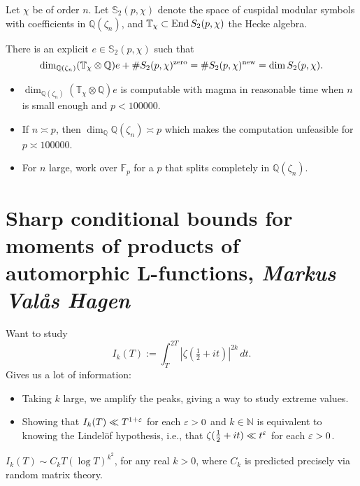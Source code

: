 \documentclass[reqno]{amsart} 
\begin{document}
Let $\chi$ be of order $n$.  Let $\mathbb{S}_2(p, \chi)$ denote the space of cuspidal modular symbols with coefficients in $\mathbb{Q}(\zeta_n)$, and $\mathbb{T}_\chi \subset \operatorname{End} S_2(p, \chi)$ the Hecke algebra.
\begin{lemma}
  There is an explicit $e \in \mathbb{S}_2(p, \chi)$ such that
  \begin{equation*}
    \dim_{\mathbb{Q}(\zeta_n)}(\mathbb{T}_\chi \otimes \mathbb{Q})e +
    \# S_2(p, \chi)^{\mathrm{zero}}
    = \# S_2(p, \chi)^{\operatorname{new}}
    = \dim S_2(p, \chi).
  \end{equation*}
\end{lemma}
\begin{itemize}
\item $\dim_{\mathbb{Q}(\zeta_n)}(\mathbb{T}_\chi \otimes \mathbb{Q}) e$ is computable with magma in reasonable time when $n$ is small enough and $p < 100000$.
\item If $n \asymp p$, then $\dim_{\mathbb{Q}} \mathbb{Q}(\zeta_n) \asymp p$ which makes the computation unfeasible for $p \asymp 100000$.
\item For $n$ large, work over $\mathbb{F}_p$ for a $p$ that splits completely in $\mathbb{Q}(\zeta_n)$.
\end{itemize}

\section{Sharp conditional bounds for moments of products of automorphic L-functions, \textnormal{\emph{Markus Valås Hagen}}}

Want to study
\begin{equation*}
  I_k(T) := \int_T^{2 T}
  \left| \zeta(\tfrac{1}{2} + i t) \right|^{2 k} \, d t.
\end{equation*}
Gives us a lot of information:
\begin{itemize}
\item Taking $k$ large, we amplify the peaks, giving a way to study extreme values.
\item Showing that $I_k(T) \ll T^{1 + \varepsilon}$ for each $\varepsilon > 0$ and $k \in \mathbb{N}$ is equivalent to knowing the Lindel\"{o}f hypothesis, i.e., that $\zeta(\tfrac{1}{2} + i t) \ll t^\varepsilon$ for each $\varepsilon > 0$.
\end{itemize}
\begin{conjecture}
  $I_k(T) \sim C_k T(\log T)^{k^2}$, for any real $k > 0$, where $C_k$ is predicted precisely via random matrix theory.
\end{conjecture}
\end{document}
